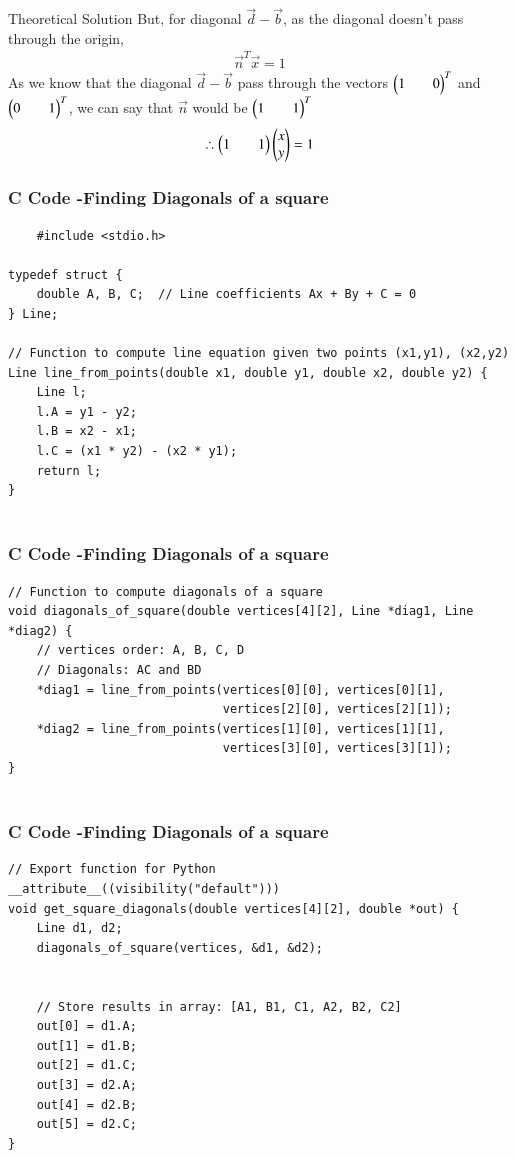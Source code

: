 \documentclass{beamer}
\begin{document}
\begin{frame}{Theoretical Solution}
But, for diagonal $\vec{d}-\vec{b}$, as the diagonal doesn't pass through the origin,
\begin{align*}
    \vec{n}^T\vec{x}=1
\end{align*}
As we know that the diagonal $\vec{d}-\vec{b}$ pass through the vectors $\begin{pmatrix}1&&0\end{pmatrix}^T$ and $\begin{pmatrix}0&&1\end{pmatrix}^T$, we can say that $\vec{n}$ would be $\begin{pmatrix}1&&1\end{pmatrix}^T$ 
\begin{align*}
    \therefore \begin{pmatrix}1&&1\end{pmatrix}\begin{pmatrix}x\\y\end{pmatrix}=1
\end{align*}
\end{frame}

\begin{frame}[fragile]
    \frametitle{C Code -Finding Diagonals of a square}

    \begin{lstlisting}
    #include <stdio.h>

typedef struct {
    double A, B, C;  // Line coefficients Ax + By + C = 0
} Line;

// Function to compute line equation given two points (x1,y1), (x2,y2)
Line line_from_points(double x1, double y1, double x2, double y2) {
    Line l;
    l.A = y1 - y2;
    l.B = x2 - x1;
    l.C = (x1 * y2) - (x2 * y1);
    return l;
}


    \end{lstlisting}
\end{frame}

\begin{frame}[fragile]
    \frametitle{C Code -Finding Diagonals of a square}

    \begin{lstlisting}
// Function to compute diagonals of a square
void diagonals_of_square(double vertices[4][2], Line *diag1, Line *diag2) {
    // vertices order: A, B, C, D
    // Diagonals: AC and BD
    *diag1 = line_from_points(vertices[0][0], vertices[0][1],
                              vertices[2][0], vertices[2][1]);
    *diag2 = line_from_points(vertices[1][0], vertices[1][1],
                              vertices[3][0], vertices[3][1]);
}


    \end{lstlisting}
\end{frame}

\begin{frame}[fragile]
    \frametitle{C Code -Finding Diagonals of a square}

    \begin{lstlisting}
// Export function for Python
__attribute__((visibility("default"))) 
void get_square_diagonals(double vertices[4][2], double *out) {
    Line d1, d2;
    diagonals_of_square(vertices, &d1, &d2);


    // Store results in array: [A1, B1, C1, A2, B2, C2]
    out[0] = d1.A;
    out[1] = d1.B;
    out[2] = d1.C;
    out[3] = d2.A;
    out[4] = d2.B;
    out[5] = d2.C;
}

    \end{lstlisting}
\end{frame}
\end{document}
